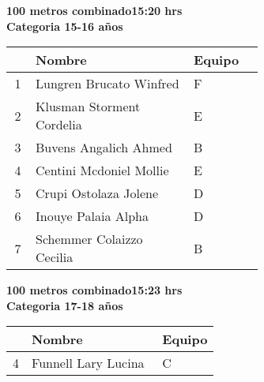 \begin{minipage}{0.95\linewidth}\vspace{0.5cm} 
\begin{flushleft}
\textbf{
\hspace{-0.15cm}100 metros combinado\hspace{1.5cm}15:20 hrs \\Categoria 15-16 años}\vspace{-0.2cm} 
\end{flushleft}
\begin{tabular}{cp{0.63\linewidth}l}
\hline
& \textbf{Nombre} & \textbf{Equipo} \\ \hline
1 & Lungren Brucato Winfred & F \\ 
2 & Klusman Storment Cordelia & E \\ 
3 & Buvens Angalich Ahmed & B \\ 
4 & Centini Mcdoniel Mollie & E \\ 
5 & Crupi Ostolaza Jolene & D \\ 
6 & Inouye Palaia Alpha & D \\ 
7 & Schemmer Colaizzo Cecilia & B \\ 
\end{tabular}
\end{minipage}
\begin{minipage}{0.95\linewidth}\vspace{0.5cm} 
\begin{flushleft}
\textbf{
\hspace{-0.15cm}100 metros combinado\hspace{1.5cm}15:23 hrs \\Categoria 17-18 años}\vspace{-0.2cm} 
\end{flushleft}
\begin{tabular}{cp{0.63\linewidth}l}
\hline
& \textbf{Nombre} & \textbf{Equipo} \\ \hline
4 & Funnell Lary Lucina & C \\ 
\end{tabular}
\end{minipage}
